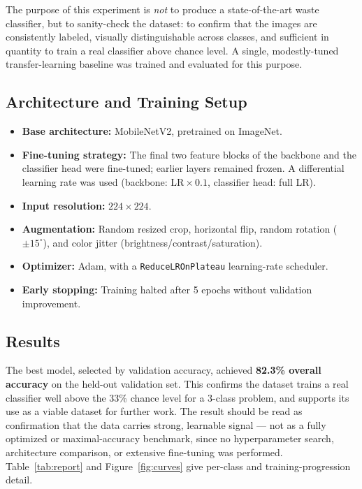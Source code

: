 \documentclass[11pt]{article}
\begin{document}
The purpose of this experiment is \emph{not} to produce a state-of-the-art waste classifier, but to sanity-check the dataset: to confirm that the images are consistently labeled, visually distinguishable across classes, and sufficient in quantity to train a real classifier above chance level. A single, modestly-tuned transfer-learning baseline was trained and evaluated for this purpose.

\subsection{Architecture and Training Setup}
\begin{itemize}
    \item \textbf{Base architecture:} MobileNetV2, pretrained on ImageNet.
    \item \textbf{Fine-tuning strategy:} The final two feature blocks of the backbone and the classifier head were fine-tuned; earlier layers remained frozen. A differential learning rate was used (backbone: $\text{LR} \times 0.1$, classifier head: full LR).
    \item \textbf{Input resolution:} $224 \times 224$.
    \item \textbf{Augmentation:} Random resized crop, horizontal flip, random rotation ($\pm 15^\circ$), and color jitter (brightness/contrast/saturation).
    \item \textbf{Optimizer:} Adam, with a \texttt{ReduceLROnPlateau} learning-rate scheduler.
    \item \textbf{Early stopping:} Training halted after 5 epochs without validation improvement.
\end{itemize}


\subsection{Results}
\label{sec:results}

The best model, selected by validation accuracy, achieved \textbf{82.3\% overall accuracy} on the held-out validation set. This confirms the dataset trains a real classifier well above the 33\% chance level for a 3-class problem, and supports its use as a viable dataset for further work. The result should be read as confirmation that the data carries strong, learnable signal --- not as a fully optimized or maximal-accuracy benchmark, since no hyperparameter search, architecture comparison, or extensive fine-tuning was performed. Table~\ref{tab:report} and Figure~\ref{fig:curves} give per-class and training-progression detail.
\end{document}
